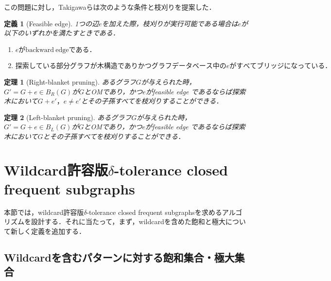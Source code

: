 \documentclass[12pt,fleqn]{jsotsuron}
\newtheorem{Theorem}{定理}
\newtheorem{Definition}{定義}
\begin{document}
この問題に対し，Takigawaらは次のような条件と枝刈りを提案した．
\begin{Definition}[Feasible edge]
1つの辺$e$を加えた際，枝刈りが実行可能である場合は$e$が以下のいずれかを満たすときである．
\begin{enumerate}
\renewcommand{\labelenumi}{(\roman{enumi})}
  \item $eが\mathrm{backward\ edge}である．$
  \item $探索している部分グラフが木構造でありかつグラフデータベース中のeがすべてブリッジになっている．$
\end{enumerate}
\end{Definition}
\begin{Theorem}[Right-blanket pruning]
あるグラフ$G$が与えられた時，$G'=G+e\in B_R(G)$が$G$とOMであり，かつ$e$がfeasible edge
であるならば探索木において$G+e'，e\neq e'$とその子孫すべてを枝刈りすることができる．
\end{Theorem}
\begin{Theorem}[Left-blanket pruning]
あるグラフ$G$が与えられた時，$G'=G+e\in B_L(G)$が$G$とOMであり，かつ$e$がfeasible edge
であるならば探索木において$G$とその子孫すべてを枝刈りすることができる．
\end{Theorem}


\section{Wildcard許容版$\delta$-tolerance closed frequent subgraphs}

本節では，wildcard許容版$\delta$-tolerance closed frequent subgraphsを求めるアルゴリズムを設計する．それに当たって，まず，wildcardを含めた飽和と極大について新しく定義を追加する．

\subsection{Wildcardを含むパターンに対する飽和集合・極大集合}
\end{document}
